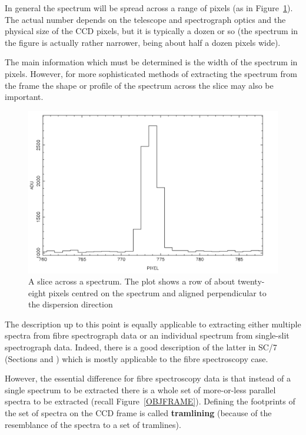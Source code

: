 \documentclass[twoside,11pt]{starlink}
\begin{document}
\begin{description}
   In general the spectrum will be spread across a range of pixels
   (as in Figure~\ref{SPSLICE}).  The actual number depends on the
   telescope and spectrograph optics and the physical size of the
   CCD pixels, but it is typically a dozen or so (the spectrum in
   the figure is actually rather narrower, being about half a dozen
   pixels wide).

   The main information which must be determined is the width of the
   spectrum in pixels.  However, for more sophisticated methods of
   extracting the spectrum from the frame the shape or profile of the
   spectrum across the slice may also be important.

\end{description}

\pagebreak
\begin{figure}[htbp]
   \centering
   \includegraphics[totalheight=4in]{sc14_spslice}
   \caption[A slice across a spectrum]{A slice across a spectrum.
    The plot shows a row of about twenty-eight pixels centred on
    the spectrum and aligned perpendicular to the dispersion
    direction
   \label{SPSLICE} }
\end{figure}

The description up to this point is equally applicable to extracting
either multiple spectra from fibre spectrograph data or an individual
spectrum from single-slit spectrograph data.  Indeed, there is a good
description of the latter in SC/7 (Sections
 and ) which
is mostly applicable to the fibre spectroscopy case.

However, the essential difference for fibre spectroscopy data is that
instead of a single spectrum to be extracted there is a whole set of
more-or-less parallel spectra to be extracted (recall
Figure~\ref{OBJFRAME}).  Defining the footprints of the set of spectra
on the CCD frame is called \textbf{tramlining} (because of the resemblance
of the spectra to a set of tramlines).
\end{document}
